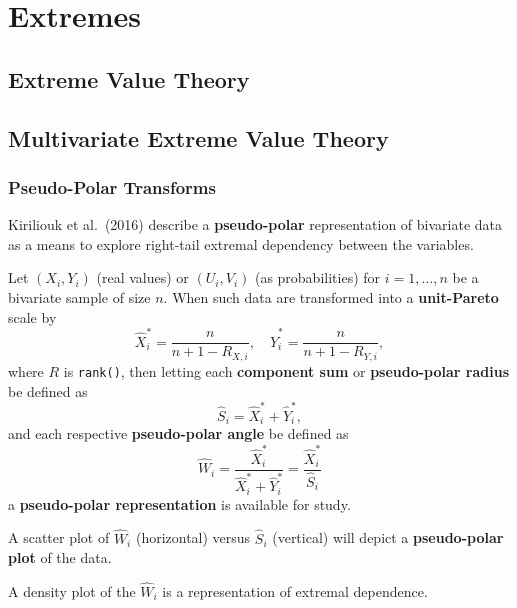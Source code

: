 \documentclass[
  letterpaper,
  DIV=11,
  numbers=noendperiod]{scrreprt}
\theoremstyle{plain}
\theoremstyle{definition}
\theoremstyle{definition}
\theoremstyle{plain}
\theoremstyle{plain}
\theoremstyle{remark}
\begin{document}
\part{Extremes}

\chapter{Extreme Value Theory}\label{extreme-value-theory}

\chapter{Multivariate Extreme Value
Theory}\label{multivariate-extreme-value-theory}

\section{Pseudo-Polar Transforms}\label{pseudo-polar-transforms}

Kiriliouk et al.~(2016) describe a \textbf{pseudo-polar} representation
of bivariate data as a means to explore right-tail extremal dependency
between the variables.

Let \((X_i, Y_i)\) (real values) or \((U_i, V_i)\) (as probabilities)
for \(i=1,\ldots, n\) be a bivariate sample of size \(n\). When such
data are transformed into a \textbf{unit-Pareto} scale by \[
\hat{X}_i^{*} = \frac{n}{n+1-R_{X,i}}, \quad{} \hat{Y}_i^{*} = \frac{n}{n+1-R_{Y,i}},
\] where \(R\) is \texttt{rank()}, then letting each \textbf{component
sum} or \textbf{pseudo-polar radius} be defined as \[
\hat{S}_i = \hat{X}_i^{*} + \hat{Y}_i^{*},
\] and each respective \textbf{pseudo-polar angle} be defined as \[
\hat{W}_i = \frac{\hat{X}_i^{*}}{\hat{X}_i^{*} + \hat{Y}_i^{*}} = \frac{\hat{X}_i^{*}}{\hat{S}_i}
\] a \textbf{pseudo-polar representation} is available for study.

A scatter plot of \(\hat{W}_i\) (horizontal) versus \(\hat{S}_i\)
(vertical) will depict a \textbf{pseudo-polar plot} of the data.

A density plot of the \(\hat{W}_i\) is a representation of extremal
dependence.
\end{document}
